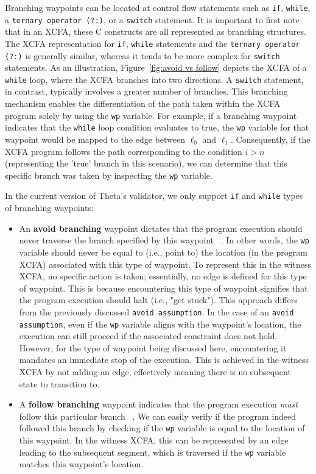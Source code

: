 Branching waypoints can be located at control flow statements such as \texttt{if}, \texttt{while}, a 
\texttt{ternary operator (?:)}, or a \texttt{switch} statement.
It is important to first note that in an XCFA, these C constructs are all represented as branching structures.
The XCFA representation for \texttt{if}, \texttt{while} statements and the \texttt{ternary operator (?:)} is generally 
similar, whereas it tends to be more complex for \texttt{switch} statements.
As an illustration, Figure~\ref{fig:avoid vs follow} depicts the XCFA of a \texttt{while} loop, where the XCFA branches into two directions. 
A \texttt{switch} statement, in contrast, typically involves a greater number of branches.
This branching mechanism enables the differentiation of the path taken within the XCFA program 
solely by using the \texttt{wp} variable.
For example, if a branching waypoint indicates that the \texttt{while} loop condition evaluates to true,
the \texttt{wp} variable for that waypoint would be mapped to the edge between $\ell_0$ and $\ell_1$. 
Consequently, if the XCFA program follows the path corresponding to the condition $i>n$ (representing 
the 'true' branch in this scenario), we can determine that this specific branch was taken by inspecting 
the \texttt{wp} variable.



In the current version of Theta's validator, we only support \texttt{if} and \texttt{while} types of branching waypoints:
\begin{itemize}
  \item An \textbf{avoid branching} waypoint dictates that the program execution should never 
    traverse the branch specified by this waypoint ~\cite{witness2}. In other words, the \texttt{wp} variable 
    should never be equal to (i.e., point to) the location (in the program XCFA) associated with this type of waypoint.
    To represent this in the witness XCFA, no specific action is taken; essentially, no edge is defined 
    for this type of waypoint. This is because encountering this type of waypoint signifies that the
    program execution should halt (i.e., "get stuck").
    This approach differs from the previously discussed \texttt{avoid assumption}. In the case of an 
    \texttt{avoid assumption}, even if the \texttt{wp} variable aligns with the waypoint's location, 
    the execution can still proceed if the associated constraint does not hold.
    However, for the type of waypoint being discussed here, encountering it mandates an immediate stop of the execution.
    This is achieved in the witness XCFA by not adding an edge, effectively meaning there is no subsequent state to transition to.
  \item A \textbf{follow branching} waypoint indicates that the program execution \emph{must} 
    follow this particular branch ~\cite{witness2}. We can easily verify if the program indeed followed this
    branch by checking if the \texttt{wp} variable is equal to the location of this waypoint. 
    In the witness XCFA, this can be represented by an edge leading to the subsequent segment, which is
    traversed if the \texttt{wp} variable matches this waypoint's location.
\end{itemize}


